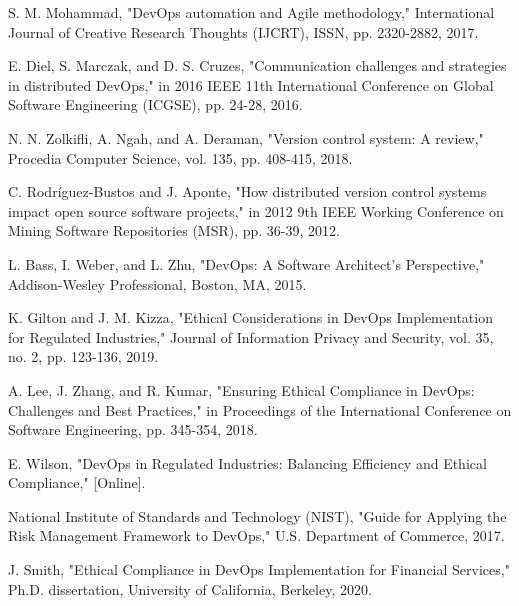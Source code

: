 \documentclass[conference]{IEEEtran}
\begin{document}
\begin{thebibliography}{00}

 S. M. Mohammad, "DevOps automation and Agile methodology," International Journal of Creative Research Thoughts (IJCRT), ISSN, pp. 2320-2882, 2017.

 E. Diel, S. Marczak, and D. S. Cruzes, "Communication challenges and strategies in distributed DevOps," in 2016 IEEE 11th International Conference on Global Software Engineering (ICGSE), pp. 24-28, 2016.

 N. N. Zolkifli, A. Ngah, and A. Deraman, "Version control system: A review," Procedia Computer Science, vol. 135, pp. 408-415, 2018.

 C. Rodríguez-Bustos and J. Aponte, "How distributed version control systems impact open source software projects," in 2012 9th IEEE Working Conference on Mining Software Repositories (MSR), pp. 36-39, 2012.

 L. Bass, I. Weber, and L. Zhu, "DevOps: A Software Architect's Perspective," Addison-Wesley Professional, Boston, MA, 2015.

 K. Gilton and J. M. Kizza, "Ethical Considerations in DevOps Implementation for Regulated Industries," Journal of Information Privacy and Security, vol. 35, no. 2, pp. 123-136, 2019.

 A. Lee, J. Zhang, and R. Kumar, "Ensuring Ethical Compliance in DevOps: Challenges and Best Practices," in Proceedings of the International Conference on Software Engineering, pp. 345-354, 2018.

 E. Wilson, "DevOps in Regulated Industries: Balancing Efficiency and Ethical Compliance," [Online].

 National Institute of Standards and Technology (NIST), "Guide for Applying the Risk Management Framework to DevOps," U.S. Department of Commerce, 2017.

 J. Smith, "Ethical Compliance in DevOps Implementation for Financial Services," Ph.D. dissertation, University of California, Berkeley, 2020.
    
\end{thebibliography}

\vspace{12pt}
\end{document}
